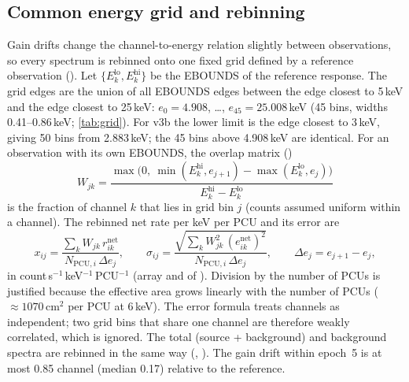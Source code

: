 \subsection{Common energy grid and rebinning}\label{sec:grid}
Gain drifts change the channel-to-energy relation slightly between observations, so every spectrum is rebinned onto one
fixed grid defined by a reference observation (). Let $\{E^{\mathrm{lo}}_k,
E^{\mathrm{hi}}_k\}$ be the EBOUNDS of the reference response. The grid edges are the union of all EBOUNDS edges between the
edge closest to 5\,keV and the edge closest to 25\,keV:
$e_0 = 4.908$, \dots, $e_{45} = 25.008$\,keV (45 bins, widths 0.41--0.86\,keV; \cref{tab:grid}). For v3b the lower limit
is the edge closest to 3\,keV, giving 50 bins from 2.883\,keV; the 45 bins above 4.908\,keV are identical.
For an observation with its own EBOUNDS, the overlap matrix ()
\begin{equation}
W_{jk} = \frac{\max\!\bigl(0,\ \min(E^{\mathrm{hi}}_k, e_{j+1}) - \max(E^{\mathrm{lo}}_k, e_j)\bigr)}{E^{\mathrm{hi}}_k - E^{\mathrm{lo}}_k}\label{eq:overlap}
\end{equation}
is the fraction of channel $k$ that lies in grid bin $j$ (counts assumed uniform within a channel). The rebinned net
rate per keV per PCU and its error are
\begin{equation}
x_{ij} = \frac{\sum_k W_{jk}\, r^{\mathrm{net}}_{ik}}{N_{\mathrm{PCU},i}\,\Delta e_j},\qquad
\sigma_{ij} = \frac{\sqrt{\sum_k W_{jk}^2\,(e^{\mathrm{net}}_{ik})^2}}{N_{\mathrm{PCU},i}\,\Delta e_j},\qquad \Delta e_j = e_{j+1}-e_j,\label{eq:rebin}
\end{equation}
in count\,s$^{-1}$\,keV$^{-1}$\,PCU$^{-1}$ (array  and  of ). Division by the
number of PCUs is justified because the effective area grows linearly with the number of PCUs ($\approx 1070$\,cm$^2$ per
PCU at 6\,keV). The error formula treats channels as independent; two grid bins that share one channel are therefore
weakly correlated, which is ignored. The total (source + background) and background spectra are rebinned in the same
way (, ). The gain drift within epoch~5 is at most 0.85 channel (median 0.17) relative to the
reference.

